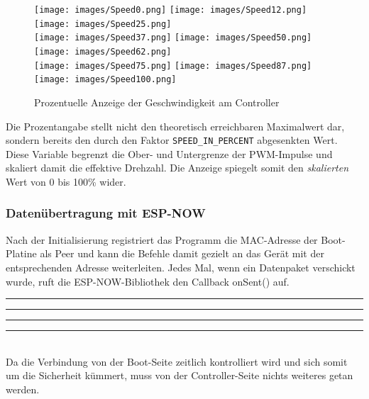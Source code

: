 \documentclass[a4paper,12pt]{article}
\begin{document}
\begin{figure}[htp]
\centering
\makebox[1em][l]{}%
\texttt{[image: images/Speed0.png]}\hspace{1pt}%
\texttt{[image: images/Speed12.png]}\hspace{1pt}%
\texttt{[image: images/Speed25.png]}\\
\makebox[1em][l]{}%
\texttt{[image: images/Speed37.png]}\hspace{1pt}%
\texttt{[image: images/Speed50.png]}\hspace{1pt}%
\texttt{[image: images/Speed62.png]}\\
\makebox[1em][l]{}%
\texttt{[image: images/Speed75.png]}\hspace{1pt}%
\texttt{[image: images/Speed87.png]}\hspace{1pt}%
\texttt{[image: images/Speed100.png]}
\caption{Prozentuelle Anzeige der Geschwindigkeit am Controller\label{fig:SpeedDisplay}}
\end{figure}

Die Prozentangabe stellt nicht den theoretisch erreichbaren Maximalwert dar, sondern bereits den durch den Faktor \texttt{SPEED\_IN\_PERCENT} abgesenkten Wert. Diese Variable begrenzt die Ober- und Untergrenze der PWM-Impulse und skaliert damit die effektive Drehzahl. Die Anzeige spiegelt somit den \emph{skalierten} Wert von 0 bis 100\% wider.

\subsubsection{Datenübertragung mit ESP-NOW}
Nach der Initialisierung registriert das Programm die MAC-Adresse der Boot-Platine als Peer und kann die Befehle damit gezielt an das Gerät mit der entsprechenden Adresse weiterleiten. Jedes Mal, wenn ein Datenpaket verschickt wurde, ruft die ESP-NOW-Bibliothek den Callback onSent() auf.
\newline\noindent\rule{\linewidth}{0.4pt}  %

\noindent\rule{\linewidth}{0.4pt}  %
\newpage
\noindent\rule{\linewidth}{0.4pt}  %

\noindent\rule{\linewidth}{0.4pt}\\[0.5em]  %
Da die Verbindung von der Boot-Seite zeitlich kontrolliert wird und sich somit um die Sicherheit kümmert, muss von der Controller-Seite nichts weiteres getan werden.
\end{document}
